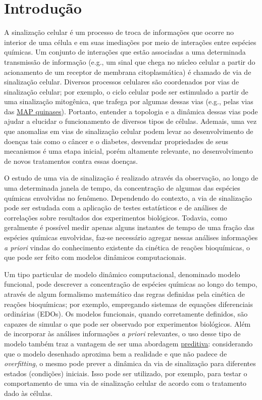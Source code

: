 \documentclass[12pt]{article}
\begin{document}
\section{Introdução}

A sinalização celular é um processo de troca de informações que ocorre no interior de uma célula e em suas imediações por meio de interações entre espécies químicas. Um conjunto de interações que estão associadas a uma determinada transmissão de informação (e.g., um sinal que chega no núcleo celular a partir do acionamento de um receptor de membrana citoplasmática) é chamado de via de sinalização celular.
Diversos processos celulares são coordenados por vias de sinalização celular; por exemplo, o ciclo celular pode ser estimulado a partir de uma sinalização mitogênica, que trafega por algumas dessas vias (e.g., pelas vias das \href{https://en.wikipedia.org/wiki/Mitogen-activated\_protein\_kinase}{MAP quinases}). Portanto, entender a topologia e a dinâmica dessas vias pode ajudar a elucidar o funcionamento de diversos tipos de células. Ademais, uma vez que anomalias em vias de sinalização celular podem levar ao desenvolvimento de doenças tais como o câncer e o diabetes, desvendar propriedades de seus mecanismos é uma etapa inicial, porém altamente relevante, no desenvolvimento de novos tratamentos contra essas doenças.

O estudo de uma via de sinalização é realizado através da observação, ao longo de uma determinada janela de tempo, da concentração de algumas das espécies químicas envolvidas no fenômeno. Dependendo do contexto, a via de sinalização pode ser estudada com a aplicação de testes estatísticos e de análises de correlações sobre resultados dos experimentos biológicos. Todavia, como geralmente é possível medir apenas alguns instantes de tempo de uma fração das espécies químicas envolvidas, faz-se necessário agregar nessas análises informações {\em a priori} vindas do conhecimento existente da cinética de reações bioquímicas, o que pode ser feito com modelos dinâmicos computacionais. 

Um tipo particular de modelo dinâmico computacional, denominado modelo funcional, pode descrever a concentração de espécies químicas ao longo do tempo, através de algum formalismo matemático das regras definidas pela cinética de reações bioquímicas; por exemplo, empregando sistemas de equações diferenciais ordinárias (EDOs). Os modelos funcionais, quando corretamente definidos, são capazes de simular o que pode ser observado por experimentos biológicos. Além de incorporar às análises informações {\em a priori} relevantes, o uso desse tipo de modelo também traz a vantagem de ser uma abordagem \underline{preditiva}: considerando que o modelo desenhado aproxima bem a realidade e que não padece de {\em overfitting}, o mesmo pode prever a dinâmica da via de sinalização para diferentes estados (condições) iniciais. Isso pode ser utilizado, por exemplo, para testar o comportamento de uma via de sinalização celular de acordo com o tratamento dado às células.
\end{document}
